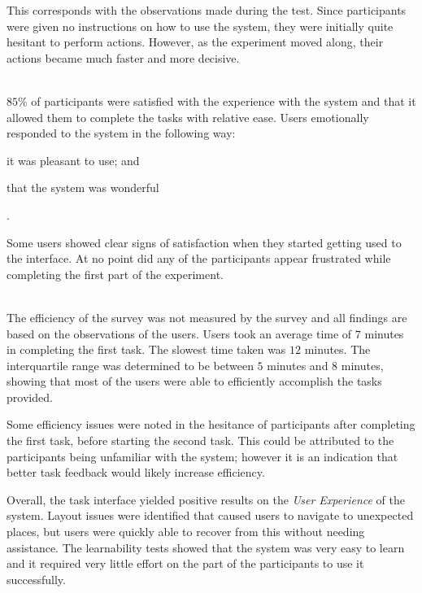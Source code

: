 \begin{description}
    	This corresponds with the observations made during the test. Since
    	participants were given no instructions on how to use the system, they
    	were initially quite hesitant to perform actions. However, as the
    	experiment moved along, their actions became much faster and more
    	decisive.

     \item[Satisfaction] \hfill \\
        $85\%$ of participants were satisfied with the experience
	with the system and that it allowed
        them to complete the tasks with relative ease. Users emotionally
        responded to the system in the following way: \begin{inparaenum}[(i)]
    	\item it was pleasant to use; and \item that the system was
        wonderful\end{inparaenum}.

        Some users showed clear signs of satisfaction when they started getting
        used to the interface. At no point did any of the participants appear
        frustrated while completing the first part of the experiment.

    \item[Efficiency] \hfill \\
        The efficiency of the survey was not measured by the survey and all
        findings are based on the observations of the users. Users took an
        average time of $7$ minutes in completing the first task. The slowest
        time taken was $12$ minutes. The interquartile range was determined
        to be between $5$ minutes and $8$ minutes, showing that most of the
        users were able to efficiently accomplish the tasks provided.

        Some efficiency issues were noted in the hesitance of participants
        after completing the first task, before starting the second task.
        This could be attributed to the participants being unfamiliar with the
        system; however it is an indication that better task feedback would
        likely increase efficiency.
\end{description}
Overall, the task interface yielded positive results on the \emph{User
Experience} of the system. Layout issues were identified that caused users
to navigate to unexpected places, but users were quickly able to recover from
this without needing assistance. The learnability tests showed that the system
was very easy to learn and it required very little effort on the part of the
participants to use it successfully.

